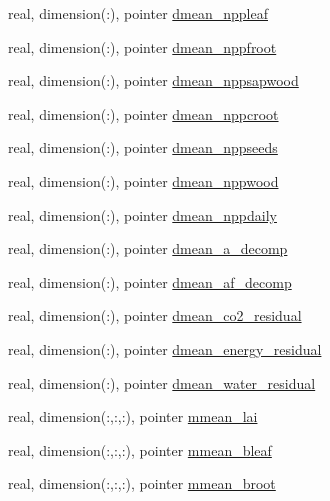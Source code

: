 \begin{DoxyCompactItemize}
\item 
real, dimension(\+:), pointer \hyperlink{structed__state__vars_1_1edtype_a27958c72baa6f198b5a939d2fafe1f9a}{dmean\+\_\+nppleaf}
\item 
real, dimension(\+:), pointer \hyperlink{structed__state__vars_1_1edtype_a4109596ff695182ab4960a451fa8eb11}{dmean\+\_\+nppfroot}
\item 
real, dimension(\+:), pointer \hyperlink{structed__state__vars_1_1edtype_a597c0bed5b9591f296a5df80fd94559d}{dmean\+\_\+nppsapwood}
\item 
real, dimension(\+:), pointer \hyperlink{structed__state__vars_1_1edtype_a33b719886c5a18aa5110c411a0461f65}{dmean\+\_\+nppcroot}
\item 
real, dimension(\+:), pointer \hyperlink{structed__state__vars_1_1edtype_a33833071e0dc6ea0248d6d957dd81b5c}{dmean\+\_\+nppseeds}
\item 
real, dimension(\+:), pointer \hyperlink{structed__state__vars_1_1edtype_a1ddf774b9a93ffb624be65c649954472}{dmean\+\_\+nppwood}
\item 
real, dimension(\+:), pointer \hyperlink{structed__state__vars_1_1edtype_ab7efb759944113385e642012e470670a}{dmean\+\_\+nppdaily}
\item 
real, dimension(\+:), pointer \hyperlink{structed__state__vars_1_1edtype_a821c3f2a18e151cf8337e0230803d108}{dmean\+\_\+a\+\_\+decomp}
\item 
real, dimension(\+:), pointer \hyperlink{structed__state__vars_1_1edtype_aeefc7281f8976046839d421aa520677a}{dmean\+\_\+af\+\_\+decomp}
\item 
real, dimension(\+:), pointer \hyperlink{structed__state__vars_1_1edtype_af41aa933e335cfafffa621db04fa0f32}{dmean\+\_\+co2\+\_\+residual}
\item 
real, dimension(\+:), pointer \hyperlink{structed__state__vars_1_1edtype_a6f72a015c28abd87618deec001de9514}{dmean\+\_\+energy\+\_\+residual}
\item 
real, dimension(\+:), pointer \hyperlink{structed__state__vars_1_1edtype_a7efe3648598a1b626bd45b6e76a29bef}{dmean\+\_\+water\+\_\+residual}
\item 
real, dimension(\+:,\+:,\+:), pointer \hyperlink{structed__state__vars_1_1edtype_a6959aa3ea60eccf8719fe367936d4e92}{mmean\+\_\+lai}
\item 
real, dimension(\+:,\+:,\+:), pointer \hyperlink{structed__state__vars_1_1edtype_ac3a08a5a677e12c31fcea036feb365e3}{mmean\+\_\+bleaf}
\item 
real, dimension(\+:,\+:,\+:), pointer \hyperlink{structed__state__vars_1_1edtype_aded49d17fd918e98fe92e221ac219161}{mmean\+\_\+broot}

\end{DoxyCompactItemize}
